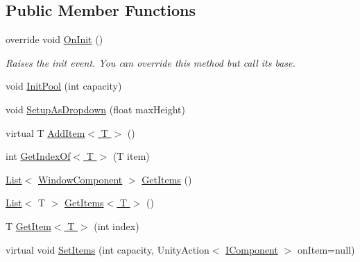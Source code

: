 \subsection*{Public Member Functions}
\begin{DoxyCompactItemize}
\item 
override void \hyperlink{class_unity_engine_1_1_u_i_1_1_windows_1_1_components_1_1_list_a50035039b166c81742c9446b6eb72b70}{On\+Init} ()
\begin{DoxyCompactList}\small\item\em Raises the init event. You can override this method but call it\textquotesingle{}s base. \end{DoxyCompactList}\item 
void \hyperlink{class_unity_engine_1_1_u_i_1_1_windows_1_1_components_1_1_list_a7e2aa5d44dc315b373daa0a01cf6a4f0}{Init\+Pool} (int capacity)
\item 
void \hyperlink{class_unity_engine_1_1_u_i_1_1_windows_1_1_components_1_1_list_ae0592aea23ea27e696796c402ec0352b}{Setup\+As\+Dropdown} (float max\+Height)
\item 
virtual T \hyperlink{class_unity_engine_1_1_u_i_1_1_windows_1_1_components_1_1_list_a393c7313e14e0e948dd6e5e8d5726dad}{Add\+Item$<$ T $>$} ()
\item 
int \hyperlink{class_unity_engine_1_1_u_i_1_1_windows_1_1_components_1_1_list_a74308d8047e06098d6fa55220a126c90}{Get\+Index\+Of$<$ T $>$} (T item)
\item 
\hyperlink{class_unity_engine_1_1_u_i_1_1_windows_1_1_components_1_1_list}{List}$<$ \hyperlink{class_unity_engine_1_1_u_i_1_1_windows_1_1_window_component}{Window\+Component} $>$ \hyperlink{class_unity_engine_1_1_u_i_1_1_windows_1_1_components_1_1_list_aa873bcbe8435fffde196cb53fec0ee71}{Get\+Items} ()
\item 
\hyperlink{class_unity_engine_1_1_u_i_1_1_windows_1_1_components_1_1_list}{List}$<$ T $>$ \hyperlink{class_unity_engine_1_1_u_i_1_1_windows_1_1_components_1_1_list_a9c07d898d5eb45dac0c42055933ec787}{Get\+Items$<$ T $>$} ()
\item 
T \hyperlink{class_unity_engine_1_1_u_i_1_1_windows_1_1_components_1_1_list_a087aa3586d7a187f1d1418468942ccd4}{Get\+Item$<$ T $>$} (int index)
\item 
virtual void \hyperlink{class_unity_engine_1_1_u_i_1_1_windows_1_1_components_1_1_list_af419418812677fa56f8df46306abde61}{Set\+Items} (int capacity, Unity\+Action$<$ \hyperlink{interface_unity_engine_1_1_u_i_1_1_windows_1_1_components_1_1_i_component}{I\+Component} $>$ on\+Item=null)

\end{DoxyCompactItemize}
